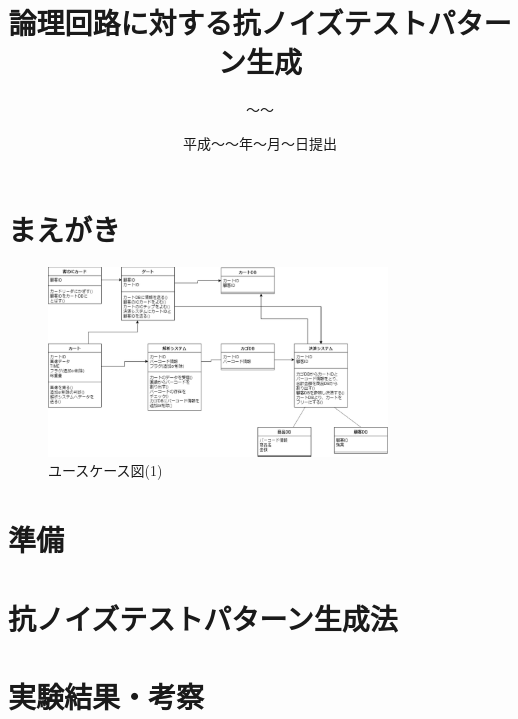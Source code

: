 

\newenvironment{indention}[1]{\par
\addtolength{\leftskip}{#1}
\begingroup}{\endgroup\par}

\title{論理回路に対する抗ノイズテストパターン生成}
\author{～～}
\date{平成～～年～月～日提出}


\maketitle
\tableofcontents
\cleardoublepage
{}

\chapter{まえがき}

\begin{figure}[htbp]
\centering
\includegraphics[width = 9cm]{class_ic.eps}
\caption{ユースケース図(1)}
\label{usecase1}
\end{figure}



\chapter{準備}


\chapter{抗ノイズテストパターン生成法}


\chapter{実験結果・考察}


